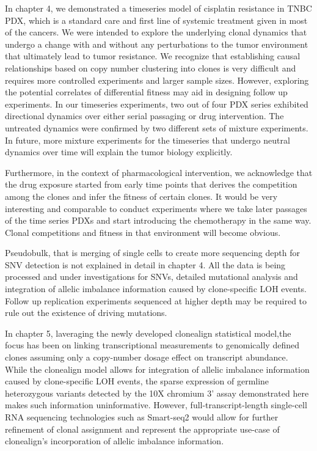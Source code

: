 In chapter 4, we demonstrated a timeseries model of cisplatin resistance in TNBC PDX, which is a standard care and first line of systemic treatment given in most of the cancers. We were intended to explore the underlying clonal dynamics that undergo a change with and without any perturbations to the tumor environment that ultimately lead to tumor resistance. We recognize that establishing causal relationships based on copy number clustering into clones is very difficult and requires more controlled experiments and larger sample sizes. However, exploring the potential correlates of differential fitness may aid in designing follow up experiments. In our timeseries experiments, two out of four PDX series exhibited directional dynamics over either serial passaging or drug intervention. The untreated dynamics were confirmed by two different sets of mixture experiments. In future, more mixture experiments for the timeseries that undergo neutral dynamics over time will explain the tumor biology explicitly. 

Furthermore, in the context of pharmacological intervention, we acknowledge that the drug exposure started from early time points that derives the competition among the clones and infer the fitness of certain clones. It would be very interesting and comparable to conduct experiments where we take later passages of the time series PDXs and start introducing the chemotherapy in the same way. Clonal competitions and fitness in that environment will become obvious.

Pseudobulk, that is merging of single cells to create more sequencing depth for SNV detection is not explained in detail in chapter 4. All the data is being processed and under investigations for SNVs, detailed mutational analysis and integration of allelic imbalance information caused by clone-specific \ac{LOH} events. Follow up replication experiments sequenced at higher depth may be required to rule out the existence of driving mutations. 


In chapter 5, laveraging the newly developed clonealign statistical model,the focus has been on linking transcriptional measurements to genomically defined clones assuming only a copy-number dosage effect on transcript abundance. While the clonealign model allows for integration of allelic imbalance information caused by clone-specific \ac{LOH} events, the sparse expression of germline heterozygous variants detected by the 10X chromium 3' assay demonstrated here makes such information uninformative. However, full-transcript-length single-cell RNA sequencing technologies such as Smart-seq2 \cite{picelli2014full} would allow for further refinement of clonal assignment and represent the appropriate use-case of clonealign’s incorporation of allelic imbalance information.



